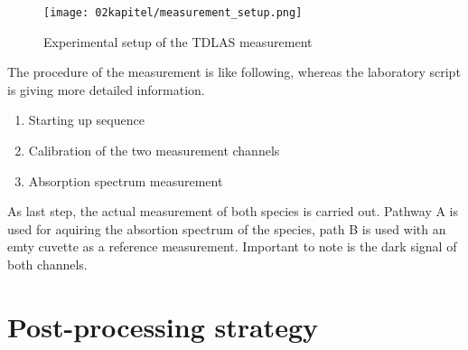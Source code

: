 \begin{figure}[!htb]
    \centering
    \texttt{[image: 02kapitel/measurement\_setup.png]}
    \caption[Experimental setup of the TDLAS measurement]{Experimental setup of the TDLAS measurement \autocite{klevanskyTDLASTunableLaser2021}}
    \label{fig:experimental-setup}
\end{figure}

The procedure of the measurement is like following, whereas the laboratory script \autocite{klevanskyTDLASTunableLaser2021} is giving more detailed information.

\begin{enumerate}
    \item Starting up sequence
    \item Calibration of the two measurement channels
    \item Absorption spectrum measurement
\end{enumerate}
As last step, the actual measurement of both species is carried out. Pathway A is used for aquiring the absortion spectrum of the species, path B is used with an emty cuvette as a reference measurement. Important to note is the dark signal of both channels.
\vspace{12pt}

\section{Post-processing strategy}
\label{sec:strategy}


